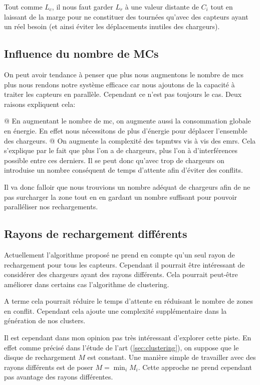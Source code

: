 \documentclass[final]{polytech/polytech}
\begin{document}
			Tout comme $L_c$, il nous faut garder $L_r$ à une valeur distante de $C_i$ tout en laissant de la marge pour ne constituer des tournées qu'avec des capteurs ayant un réel besoin (et ainsi éviter les déplacements inutiles des chargeurs).
		
		\subsection{Influence du nombre de MCs}
			On peut avoir tendance à penser que plus nous augmentons le nombre de \glspl{mc} plus nous rendons notre système efficace car nous ajoutons de la capacité à traiter les capteurs en parallèle.
			Cependant ce n'est pas toujours le cas.
			Deux raisons expliquent cela:
			\begin{easylist}
				@ En augmentant le nombre de \gls{mc}, on augmente aussi la consommation globale en énergie.
				En effet nous nécessitons de plus d'énergie pour déplacer l'ensemble des chargeurs.
				@ On augmente la complexité des \glspl{tspmtw} vis à vis des \glspl{emr}.
				Cela s'explique par le fait que plus l'on a de chargeurs, plus l'on à d'interférences possible entre ces derniers.
				Il se peut donc qu'avec trop de chargeurs on introduise un nombre conséquent de temps d'attente afin d'éviter des conflits.
			\end{easylist}
			
			Il va donc falloir que nous trouvions un nombre adéquat de chargeurs afin de ne pas surcharger la zone tout en en gardant un nombre suffisant pour pouvoir paralléliser nos rechargements.
		
		\subsection{Rayons de rechargement différents}
			Actuellement l'algorithme proposé ne prend en compte qu'un seul rayon de rechargement pour tous les capteurs.
			Cependant il pourrait être intéressant de considérer des chargeurs ayant des rayons différents.
			Cela pourrait peut-être améliorer dans certains cas l'algorithme de clustering.
			
			A terme cela pourrait réduire le temps d'attente en réduisant le nombre de zones en conflit.
			Cependant cela ajoute une complexité supplémentaire dans la génération de nos clusters.
			
			Il est cependant dans mon opinion pas très intéressant d'explorer cette piste.
			En effet comme précisé dans l'étude de l'art (\autoref{sec:clustering}), on suppose que le disque de rechargement $M$ est constant.
			Une manière simple de travailler avec des rayons différents est de poser $M=\min_{i}M_i$.
			Cette approche ne prend cependant pas avantage des rayons différentes.
			
\end{document}
